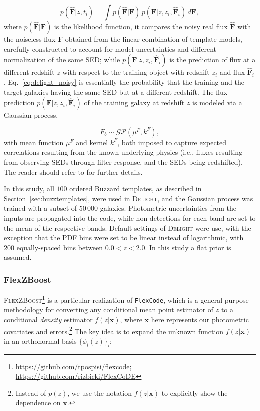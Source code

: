 \documentclass[usenatbib]{mn2e}
\def\x{{\mathbf{x}}}
\begin{document}
\begin{equation} \label{eq:delight_noisy}
p(\mathbf{\hat{F}}|z,t_i) = \int p(\mathbf{\hat{F}}|\mathbf{F})\, p(\mathbf{F}|z,z_i,\mathbf{\hat{F}}_i)\, d\mathbf{F},
\end{equation}
where $p(\mathbf{\hat{F}}|\mathbf{F})$ is the likelihood function, it compares the noisy real flux $\mathbf{\hat{F}}$ with the noiseless flux $\mathbf{F}$ obtained from the linear combination of template models, carefully constructed to account for model uncertainties and different normalization of the same SED; while $p(\mathbf{F}|z,z_i,\mathbf{\hat{F}}_i)$ is the prediction of flux at a different redshift $z$ with respect to the training object with redshift $z_i$ and flux $\mathbf{\hat{F}}_i$. Eq.~\ref{eq:delight_noisy} is essentially the probability that the training and the target galaxies having the same SED but at a different redshift. The flux prediction $p(\mathbf{F}|z,z_i,\mathbf{\hat{F}}_i)$ of the training galaxy at redshift $z$ is modeled via a Gaussian process,

\begin{equation} \label{eq:delight_gp}
F_b \sim \mathcal{GP}\left( \mu^F,k^F \right),
\end{equation}
\noindent with mean function $\mu^F$ and kernel $k^F$, both imposed to capture expected correlations resulting from the known underlying physics (i.e., fluxes resulting from observing SEDs through filter response, and the SEDs being redshifted). The reader should refer to \citet{Leistedt:17} for further details.

In this study, all $100$ ordered Buzzard templates, as described in Section~\ref{sec:buzztemplates}, were used in \textsc{Delight}, and the Gaussian process was trained with a subset of $50\,000$ galaxies. Photometric uncertainties from the inputs are propagated into the code, while non-detections for each band are set to the mean of the respective bands. Default settings of \textsc{Delight} were use, with the exception that the PDF bins were set to be linear instead of logarithmic, with $200$ equally-spaced bins between $0.0<z<2.0$. In this study a flat prior is assumed.


\subsubsection{FlexZBoost}
\label{sec:flexzboost}

\textsc{FlexZBoost}\footnote{\url{https://github.com/tpospisi/flexcode};\\ \url{https://github.com/rizbicki/FlexCoDE}} \citep{Izbicki:17} is a particular realization of \texttt{FlexCode}, which is a general-purpose methodology for converting any conditional mean point estimator of $z$ to a conditional {\em density} estimator $f(z \vert \x)$, where $\x$ here represents our photometric covariates and errors.\footnote{Instead of $p(z)$, we use the notation $f(z \vert \x)$ to explicitly show the dependence on $\x$.} The key idea is to expand the unknown function $f(z \vert \x)$ in an orthonormal basis $\{\phi_i(z)\}_{i}$:
\end{document}
